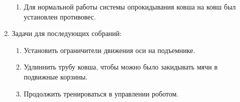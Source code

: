 \begin{enumerate}
\begin{enumerate}
      \item Для нормальной работы системы опрокидывания ковша на ковш был установлен противовес.
    \end{enumerate}
    
	\item Задачи для последующих собраний:
	\begin{enumerate}
	  \item Установить ограничители движения оси на подъемнике.
	  
	  \item Удлиннить трубу ковша, чтобы можно было закидывать мячи в подвижные корзины.
	  
	  \item Продолжить тренироваться в управлении роботом.

    \end{enumerate}     
\end{enumerate}
\fillpage